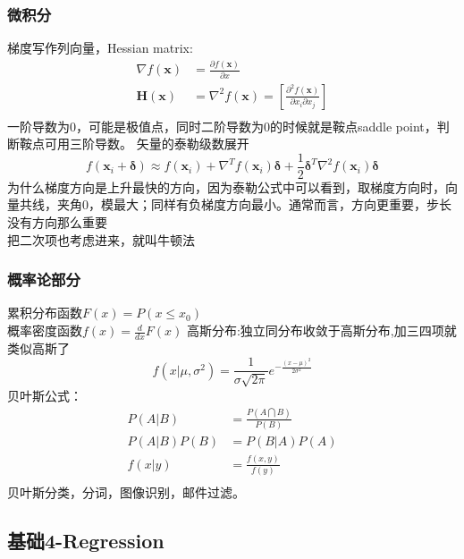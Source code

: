 \documentclass[UTF8]{../computerUniverse}
\begin{document}
\subsubsection{微积分}
梯度写作列向量，Hessian matrix: 
\begin{equation}
\begin{split}
 \nabla f(\mathbf x)&= \frac{\partial f(\mathbf x)}{\partial x}\\
\mathbf H (\mathbf x)&= \nabla ^2 f(\mathbf x)=\left[ \frac{\partial ^2 f(\mathbf x)}{\partial x_i \partial x_j} \right]\\
\end{split}
\end{equation}
 一阶导数为0，可能是极值点，同时二阶导数为0的时候就是鞍点saddle point，判断鞍点可用三阶导数。
矢量的泰勒级数展开
\begin{equation}
f(\mathbf x_i +\mathbf \delta) \approx f(\mathbf x_i)+
\nabla ^T f(\mathbf x_i) \mathbf \delta +
\frac{1}{2}\mathbf \delta ^T \nabla ^2 f(\mathbf x_i)\mathbf \delta
\end{equation}
为什么梯度方向是上升最快的方向，因为泰勒公式中可以看到，取梯度方向时，向量共线，夹角0，模最大；同样有负梯度方向最小。通常而言，方向更重要，步长没有方向那么重要\\
把二次项也考虑进来，就叫牛顿法

\subsubsection{概率论部分}
累积分布函数$F(x)=P(x \leqslant x_0)$\\
概率密度函数$f(x)=\frac{d}{dx}F(x)$
高斯分布:独立同分布收敛于高斯分布,加三四项就类似高斯了
\begin{equation}
f(x| \mu ,\sigma^2)= \frac{1}{\sigma \sqrt{2\pi}}e^{-\frac{(x-\mu)^2}{2\sigma^2}}
\end{equation}
贝叶斯公式：
\begin{equation}
\begin{split}
    P(A|B) &= \frac{P(A \bigcap B )}{P(B)}\\
    P(A|B) P(B)&= P(B|A) P(A)  \\
    f(x|y) &= \frac{f(x,y)}{f(y)}\\
\end{split}
\end{equation}
贝叶斯分类，分词，图像识别，邮件过滤。



\subsection{基础4-Regression}
\end{document}
